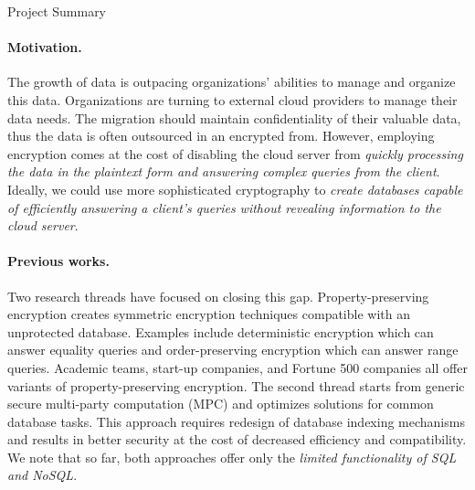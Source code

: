 \documentclass[11pt]{article}
\begin{document}
\begin{center}
\LARGE
Project Summary 
\end{center}

\vspace{-1.5em}
\noindent \hrulefill



\paragraph{Motivation.}
%
The growth of data is outpacing organizations' abilities to manage and
organize this data. Organizations are turning to external cloud providers
to manage their data needs.  
%
The migration should maintain confidentiality of their
valuable data, thus the data is often outsourced in an encrypted from. 
%
However, employing encryption comes at the cost of disabling the cloud server
from {\em quickly processing the data in the plaintext form and answering
complex queries from the client}. 
%
Ideally, we could use more sophisticated cryptography to {\em create databases
capable of efficiently answering a client's queries without revealing
information to the cloud server}.  

\paragraph{Previous works.}
Two research threads have focused on closing this gap.
Property-preserving encryption creates symmetric encryption techniques
compatible with an unprotected database. Examples include deterministic
encryption which can answer equality queries and order-preserving encryption
which can answer range queries. Academic teams, start-up companies, and Fortune
500 companies all offer variants of property-preserving encryption.
%
The second thread starts from generic secure multi-party computation (MPC) and
optimizes solutions for common database tasks. This approach requires redesign
of database indexing mechanisms and results in better security at the cost of
decreased efficiency and compatibility. 
%
We note that so far, both approaches offer only the {\em limited functionality
of SQL and NoSQL}. 
\end{document}
